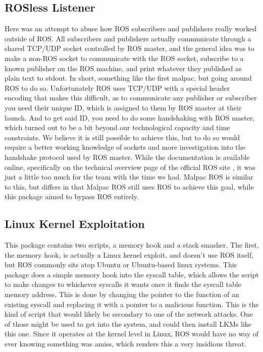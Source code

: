 \documentclass[IEEEtran,letterpaper,10pt,notitlepage,draftclsnofoot]{article}
\begin{document}
\subsection{ROSless Listener}
Here was an attempt to abuse how ROS subscribers and publishers really worked outside of ROS.
All subscribers and publishers actually communicate through a shared TCP/UDP socket controlled by ROS master, and the general 
idea was to make a non-ROS socket to communicate with the ROS socket, subscribe to a known publisher on the ROS machine, and 
print whatever they published as plain text to stdout.
In short, something like the first malpac, but going around ROS to do so. Unfortunately ROS uses TCP/UDP with a special header encoding that makes this difficult, as to communicate any publisher or subscriber you need their unique ID, which is assigned to them by ROS master at their launch. And to get said ID, you need to do some handshaking with ROS master, which turned out to be a bit beyond our technological capacity and time constraints.
We believe it is still possible to achieve this, but to do so would require a better working knowledge of sockets and more 
investigation into the handshake protocol used by ROS master.
While the documentation is available online, specifically on the technical overview page of the official ROS site \cite{ROS}, it was just a little too much for the team with the time we had. Malpac ROS is similar to this, but differs in that Malpac ROS 
still uses ROS to achieve this goal, while this package aimed to bypass ROS entirely.

\subsection{Linux Kernel Exploitation}
This package contains two scripts, a memory hook and a stack smasher.
The first, the memory hook, is actually a Linux kernel exploit, and doesn't use ROS itself, but ROS commonly sits atop Ubuntu or Ubuntu-based linux systems. \cite{kern}
This package does a simple memory hook into the syscall table, which allows the script to make changes to whichever syscalls it wants once it finds the syscall table memory address. \cite{hook}
This is done by changing the pointer to the function of an existing syscall and replacing it with a pointer to a malicious function.
This is the kind of script that would likely be secondary to one of the network attacks. One of those might be used to get into the system, and could then install LKMs like this one. Since it operates at the kernel level in Linux, ROS would have no way of ever knowing something was amiss, which renders this a very insidious threat.
\end{document}
